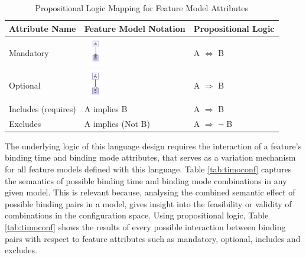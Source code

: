 \documentclass[conference]{IEEEtran}
\begin{document}
\begin{table}[htbp]
\caption{Propositional Logic Mapping for Feature Model Attributes}
\begin{center}
\begin{tabular}{|P{2.5cm}|P{2.5cm}|P{2.5cm}|}
\hline
    Attribute Name & Feature Model Notation & Propositional Logic  \\ \hline
    Mandatory & 
\vspace{0.3px}    
\includegraphics[width=10mm, height=12mm]{diagrams/mandatory.png} & A $ \Leftrightarrow $ B \\ \hline
    Optional &\vspace{0.3px} \includegraphics[width=10mm, height=12mm]{diagrams/optional.png}  & A $ \Rightarrow $ B \\ \hline
    Includes (requires) & A implies B &  A $ \Rightarrow $ B \\ \hline
    Excludes & A implies (Not B) &  A $ \Rightarrow $ $ \neg $ B \\ \hline
\end{tabular}
\label{tab:propmap}
\end{center}
\end{table}

The underlying logic of this language design requires the interaction of a feature's binding time and binding mode attributes, that serves as a variation mechanism for all feature models defined with this language. Table \ref{tab:timoconf} captures the semantics of possible binding time and binding mode combinations in any given model. This is relevant because, analysing the combined semantic effect of possible binding pairs in a model, gives insight into the feasibility or validity of combinations in the configuration space. Using propositional logic, Table \ref{tab:timoconf} shows the results of every possible interaction between binding pairs with respect to feature attributes such as mandatory, optional, includes and excludes. 
\end{document}
